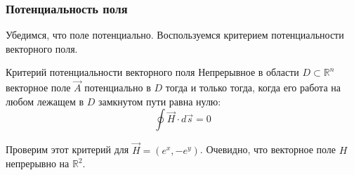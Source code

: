 \begin{frame}\frametitle{Потенциальность поля}
Убедимся, что поле потенциально.
Воспользуемся критерием потенциальности векторного поля.

\begin{block}{Критерий потенциальности векторного поля}
  Непрерывное в области \( D \subset \mathbb{R}^n \) векторное поле \(\vec A\)
  потенциально в \(D\) тогда и только тогда, когда его работа на любом лежащем в \(D\)
  замкнутом пути равна нулю:
  \begin{equation*}
    \oint \vec H \cdot d \vec s = 0
  \end{equation*}
\end{block}

Проверим этот критерий для \( \vec H = (e^x, - e^y) \).
Очевидно, что векторное поле \(H\) непрерывно на \(\mathbb{R}^2\).

\end{frame}   
